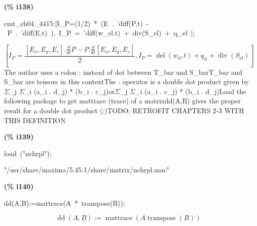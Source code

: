 \documentclass[fleqn]{article}
\begin{document}
\noindent
\begin{minipage}[t]{4.000000em}\color{red}\bfseries
(\% i138)	
\end{minipage}
\begin{minipage}[t]{\textwidth}\color{blue}
cmt\_ch04\_4415:[I\_P=(1/2)\ *\ (E\ .\ 'diff(P,t)\ -\ P\ .\ 'diff(E,t)\ ),\ I\_P\ =\ 'diff(w\_el.t)\ +\ div(S\_el)\ +\ q\_el\ ];
\end{minipage}
\[\displaystyle \tag{\% o138} 
\left[ {I_P}=\frac{\left[ {E_x}\operatorname{,}{E_y}\operatorname{,}{E_z}\right] \ensuremath{\mathrm{ . }}\frac{d}{d t} P-P\ensuremath{\mathrm{ . }}\frac{d}{d t} \left[ {E_x}\operatorname{,}{E_y}\operatorname{,}{E_z}\right] }{2}\operatorname{,}{I_P}=\operatorname{del}\left( {w_{\ensuremath{\mathrm{el}}}}\ensuremath{\mathrm{ . }}t\right) +{q_{\ensuremath{\mathrm{el}}}}+\operatorname{div}\left( {S_{\ensuremath{\mathrm{el}}}}\right) \right] \mbox{}
\]
The author uses a colon : instead of dot between T\_bar and S\_barT\_bar and S\_bar are tensors in this contextThe : operator is a double dot product given by\ensuremath{\Sigma}\_j \ensuremath{\Sigma}\_i (a\_i . d\_j) * (b\_i . c\_j)or\ensuremath{\Sigma}\_j \ensuremath{\Sigma}\_i (a\_i . c\_j) * (b\_i . d\_j)Load the following package to get mattrace (trace) of a matrixdd(A,B) gives the proper result for a double dot product (:)TODO: RETROFIT CHAPTERS 2-3 WITH THIS DEFINITION


\noindent
\begin{minipage}[t]{4.000000em}\color{red}\bfseries
(\% i139)	
\end{minipage}
\begin{minipage}[t]{\textwidth}\color{blue}
load\ ("nchrpl");
\end{minipage}
\[\displaystyle \tag{\% o139} 
\mbox{}
\]"/usr/share/maxima/5.45.1/share/matrix/nchrpl.mac"



\noindent
\begin{minipage}[t]{4.000000em}\color{red}\bfseries
(\% i140)	
\end{minipage}
\begin{minipage}[t]{\textwidth}\color{blue}
dd(A,B):=mattrace(A\ *\ transpose(B));
\end{minipage}
\[\displaystyle \tag{\% o140} 
\operatorname{dd}\left( A\operatorname{,}B\right) \operatorname{:=}\operatorname{mattrace}\left( A \operatorname{transpose}(B)\right) \mbox{}
\]
\end{document}
